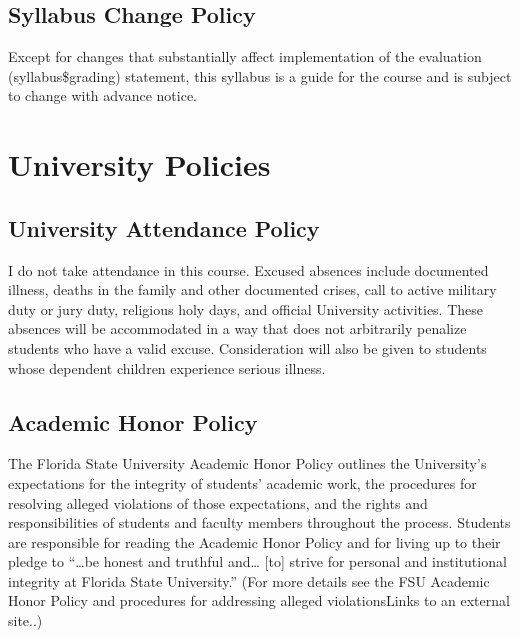 \documentclass[10pt,]{article}
\begin{document}
\hypertarget{syllabus-change-policy}{%
\subsection{Syllabus Change Policy}\label{syllabus-change-policy}}

Except for changes that substantially affect implementation of the
evaluation (syllabus\$grading) statement, this syllabus is a guide for
the course and is subject to change with advance notice.

\hypertarget{university-policies}{%
\section{University Policies}\label{university-policies}}

\hypertarget{university-attendance-policy}{%
\subsection{University Attendance
Policy}\label{university-attendance-policy}}

I do not take attendance in this course. Excused absences include
documented illness, deaths in the family and other documented crises,
call to active military duty or jury duty, religious holy days, and
official University activities. These absences will be accommodated in a
way that does not arbitrarily penalize students who have a valid excuse.
Consideration will also be given to students whose dependent children
experience serious illness.

\hypertarget{academic-honor-policy}{%
\subsection{Academic Honor Policy}\label{academic-honor-policy}}

The Florida State University Academic Honor Policy outlines the
University's expectations for the integrity of students' academic work,
the procedures for resolving alleged violations of those expectations,
and the rights and responsibilities of students and faculty members
throughout the process. Students are responsible for reading the
Academic Honor Policy and for living up to their pledge to ``\ldots be
honest and truthful and\ldots{} {[}to{]} strive for personal and
institutional integrity at Florida State University.'' (For more details
see the FSU Academic Honor Policy and procedures for addressing alleged
violationsLinks to an external site..)
\end{document}
